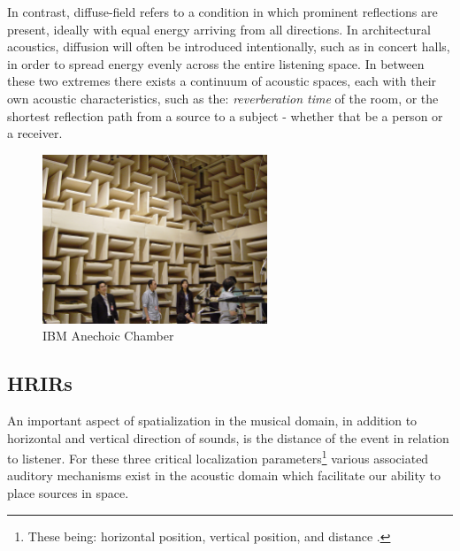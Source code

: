 In contrast, diffuse-field refers to a condition in which prominent reflections are present, ideally with equal energy arriving from all directions. In architectural acoustics, diffusion will often be introduced intentionally, such as in concert halls, in order to spread energy evenly across the entire listening space. In between these two extremes there exists a continuum of acoustic spaces, each with their own acoustic characteristics, such as the: \textit{reverberation time} of the room, or the shortest reflection path from a source to a subject - whether that be a person or a receiver. 

\begin{figure}[ht!]%
\centering
\includegraphics[width=0.6\textwidth]{img/ibm-anechoic.jpg} 
\caption{IBM Anechoic Chamber \cite{FileIBMA4:online}}
\label{fig:ibm-anechoic}
\end{figure}


\subsection{HRIRs}\label{subsec:hrirs}

An important aspect of spatialization in the musical domain, in addition to horizontal and vertical direction of sounds, is the distance of the event in relation to listener. For these three critical localization parameters\footnote{These being: horizontal position, vertical position, and distance .} various associated auditory mechanisms exist in the acoustic domain which facilitate our ability to place sources in space. 


